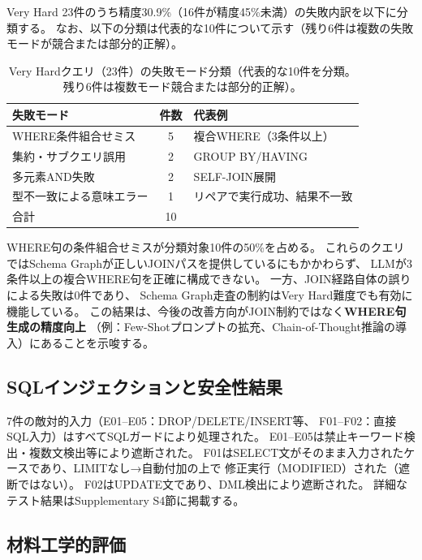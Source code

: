 \documentclass[5p,twocolumn]{elsarticle}
\begin{document}
Very Hard 23件のうち精度30.9\%（16件が精度45\%未満）の失敗内訳を以下に分類する。
なお、以下の分類は代表的な10件について示す（残り6件は複数の失敗モードが競合または部分的正解）。

\begin{table}[htbp]
  \centering
  \caption{Very Hardクエリ（23件）の失敗モード分類（代表的な10件を分類。残り6件は複数モード競合または部分的正解）。}
  \label{tab:vhard_failure}
  \small
  \begin{tabular}{lcl}
    \toprule
    失敗モード & 件数 & 代表例 \\
    \midrule
    WHERE条件組合せミス & 5 & 複合WHERE（3条件以上） \\
    集約・サブクエリ誤用 & 2 & GROUP BY/HAVING \\
    多元素AND失敗 & 2 & SELF-JOIN展開 \\
    型不一致による意味エラー & 1 & リペアで実行成功、結果不一致 \\
    \midrule
    合計 & 10 & \\
    \bottomrule
  \end{tabular}
\end{table}

WHERE句の条件組合せミスが分類対象10件の50\%を占める。
これらのクエリではSchema Graphが正しいJOINパスを提供しているにもかかわらず、
LLMが3条件以上の複合WHERE句を正確に構成できない。
一方、JOIN経路自体の誤りによる失敗は0件であり、
Schema Graph走査の制約はVery Hard難度でも有効に機能している。
この結果は、今後の改善方向がJOIN制約ではなく\textbf{WHERE句生成の精度向上}
（例：Few-Shotプロンプトの拡充、Chain-of-Thought推論の導入）にあることを示唆する。

\subsection{SQLインジェクションと安全性結果}

7件の敵対的入力（E01--E05：DROP/DELETE/INSERT等、
F01--F02：直接SQL入力）はすべてSQLガードにより処理された。
E01--E05は禁止キーワード検出・複数文検出等により遮断された。
F01はSELECT文がそのまま入力されたケースであり、LIMITなし→自動付加の上で
修正実行（MODIFIED）された（遮断ではない）。
F02はUPDATE文であり、DML検出により遮断された。
詳細なテスト結果はSupplementary S4節に掲載する。

\subsection{材料工学的評価}
\label{sec:materials_evaluation}
\end{document}
